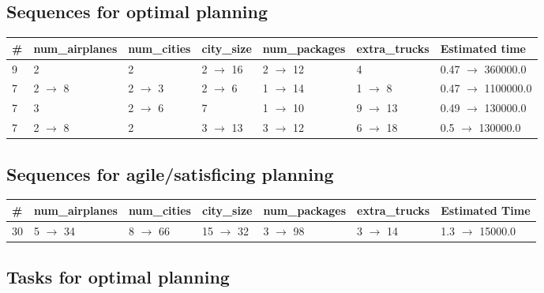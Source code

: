\documentclass{article}
\begin{document}
                            \subsection*{Sequences for optimal planning}

                            \begin{center}
                            \begin{tabular}{@{}l|l|l|l|l|l|l@{}}
                            \# & num\_airplanes & num\_cities & city\_size & num\_packages & extra\_trucks & Estimated time\\\midrule
                            9&2&2&2 $\rightarrow$ 16&2 $\rightarrow$ 12&4&0.47 $\rightarrow$ 360000.0\\
7&2 $\rightarrow$ 8&2 $\rightarrow$ 3&2 $\rightarrow$ 6&1 $\rightarrow$ 14&1 $\rightarrow$ 8&0.47 $\rightarrow$ 1100000.0\\
7&3&2 $\rightarrow$ 6&7&1 $\rightarrow$ 10&9 $\rightarrow$ 13&0.49 $\rightarrow$ 130000.0\\
7&2 $\rightarrow$ 8&2&3 $\rightarrow$ 13&3 $\rightarrow$ 12&6 $\rightarrow$ 18&0.5 $\rightarrow$ 130000.0
                            \end{tabular}
                            \end{center}
                    
                         \subsection*{Sequences for agile/satisficing planning}

                        \begin{center}
                        \begin{tabular}{@{}l|l|l|l|l|l|l@{}}
                        \# & num\_airplanes & num\_cities & city\_size & num\_packages & extra\_trucks & Estimated Time\\\midrule
                        30&5 $\rightarrow$ 34&8 $\rightarrow$ 66&15 $\rightarrow$ 32&3 $\rightarrow$ 98&3 $\rightarrow$ 14&1.3 $\rightarrow$ 15000.0
                        \end{tabular}
                        \end{center}
                    
                                \subsection*{Tasks for optimal planning}
                                
\end{document}

